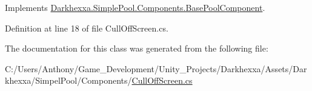 Implements \hyperlink{class_darkhexxa_1_1_simple_pool_1_1_components_1_1_base_pool_component_a7173f329105a68229c0c4de3e08faf20}{Darkhexxa.\-Simple\-Pool.\-Components.\-Base\-Pool\-Component}.



Definition at line 18 of file Cull\-Off\-Screen.\-cs.



The documentation for this class was generated from the following file\-:\begin{DoxyCompactItemize}
\item 
C\-:/\-Users/\-Anthony/\-Game\-\_\-\-Development/\-Unity\-\_\-\-Projects/\-Darkhexxa/\-Assets/\-Darkhexxa/\-Simpel\-Pool/\-Components/\hyperlink{_cull_off_screen_8cs}{Cull\-Off\-Screen.\-cs}\end{DoxyCompactItemize}
